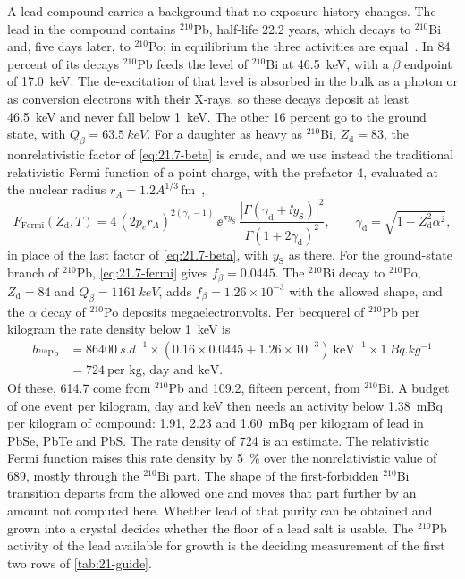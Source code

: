 A lead compound carries a background that no exposure history changes. The lead in the compound contains $^{210}$Pb, half-life 22.2 years, which decays to $^{210}$Bi and, five days later, to $^{210}$Po; in equilibrium the three activities are equal~\cite{iaea2026livechart}. In 84 percent of its decays $^{210}$Pb feeds the level of $^{210}$Bi at \SI{46.5}{keV}, with a $\beta$ endpoint of \SI{17.0}{keV}. The de-excitation of that level is absorbed in the bulk as a photon or as conversion electrons with their X-rays, so these decays deposit at least \SI{46.5}{keV} and never fall below \SI{1}{keV}. The other 16 percent go to the ground state, with $Q_\beta = \SI{63.5}{keV}$. For a daughter as heavy as $^{210}$Bi, $Z_{\mathrm{d}} = 83$, the nonrelativistic factor of \cref{eq:21.7-beta} is crude, and we use instead the traditional relativistic Fermi function of a point charge, with the prefactor 4, evaluated at the nuclear radius $r_A = 1.2A^{1/3}\,\mathrm{fm}$~\cite[Eq.~(6)]{hayen2018high},
\begin{equation}
  F_{\mathrm{Fermi}}(Z_{\mathrm{d}}, T) = 4\,(2p_er_A)^{2(\gamma_{\mathrm{d}} - 1)}\,\ee^{\pi y_{\mathrm{S}}}\,\frac{|\Gamma(\gamma_{\mathrm{d}} + \ii y_{\mathrm{S}})|^2}{\Gamma(1 + 2\gamma_{\mathrm{d}})^2} , \qquad \gamma_{\mathrm{d}} = \sqrt{1 - Z_{\mathrm{d}}^2\alpha^2} ,
  \label{eq:21.7-fermi}
\end{equation}
in place of the last factor of \cref{eq:21.7-beta}, with $y_{\mathrm{S}}$ as there. For the ground-state branch of $^{210}$Pb, \cref{eq:21.7-fermi} gives $f_\beta = 0.0445$. The $^{210}$Bi decay to $^{210}$Po, $Z_{\mathrm{d}} = 84$ and $Q_\beta = \SI{1161}{keV}$, adds $f_\beta = 1.26\times10^{-3}$ with the allowed shape, and the $\alpha$ decay of $^{210}$Po deposits megaelectronvolts. Per becquerel of $^{210}$Pb per kilogram the rate density below \SI{1}{keV} is
\begin{equation}
  \begin{split}
  b_{^{210}\mathrm{Pb}} &= \SI{86400}{s.d^{-1}}\times(0.16 \times 0.0445 + 1.26\times10^{-3})\ \mathrm{keV}^{-1}\times\SI{1}{Bq.kg^{-1}}\\
  &= 724\ \text{per kg, day and keV} .
  \end{split}
  \label{eq:21.7-pb210}
\end{equation}
Of these, 614.7 come from $^{210}$Pb and 109.2, fifteen percent, from $^{210}$Bi. A budget of one event per kilogram, day and keV then needs an activity below \SI{1.38}{mBq} per kilogram of compound: 1.91, 2.23 and \SI{1.60}{mBq} per kilogram of lead in PbSe, PbTe and PbS. The rate density of 724 is an estimate. The relativistic Fermi function raises this rate density by \SI{5}{\percent} over the nonrelativistic value of 689, mostly through the $^{210}$Bi part. The shape of the first-forbidden $^{210}$Bi transition departs from the allowed one and moves that part further by an amount not computed here. Whether lead of that purity can be obtained and grown into a crystal decides whether the floor of a lead salt is usable. The $^{210}$Pb activity of the lead available for growth is the deciding measurement of the first two rows of \cref{tab:21-guide}.

